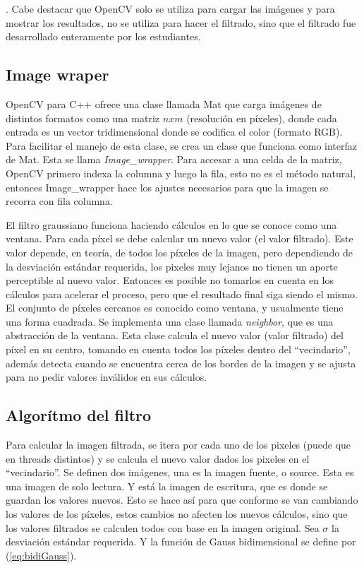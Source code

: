 \documentclass {article}
\begin{document}
. Cabe destacar que OpenCV
solo se utiliza para cargar las imágenes y para mostrar los resultados, no se utiliza para hacer el
filtrado, sino que el filtrado fue desarrollado enteramente por los estudiantes.

\subsection{Image wraper}
OpenCV para C++ ofrece una clase llamada Mat que carga imágenes de distintos formatos como una
matriz $nxm$ (resolución en píxeles), donde cada entrada es un vector tridimensional donde se
codifica el color (formato RGB). Para facilitar el manejo de esta clase, se crea un clase que
funciona como interfaz de Mat. Esta se llama \textit{Image\_wrapper}. Para accesar a una celda de la
matriz, OpenCV primero indexa la columna y luego la fila, esto no es el método natural, entonces
Image\_wrapper hace los ajustes necesarios para que la imagen se recorra con fila columna.

El filtro graussiano funciona haciendo cálculos en lo que se conoce como una ventana. Para cada
píxel se debe calcular un nuevo valor (el valor filtrado). Este valor depende, en teoría, de todos
los píxeles de la imagen, pero dependiendo de la desviación estándar requerida, los pixeles muy
lejanos no tienen un aporte perceptible al nuevo valor. Entonces es posible no tomarlos en cuenta en
los cálculos para acelerar el proceso, pero que el resultado final siga siendo el mismo. El conjunto
de píxeles cercanos es conocido como ventana, y usualmente tiene una forma cuadrada. Se implementa
una clase llamada \textit{neighbor}, que es una abstracción de la ventana. Esta clase calcula el
nuevo valor (valor filtrado) del píxel en su centro, tomando en cuenta todos los píxeles dentro del
``vecindario'', además detecta cuando
se encuentra cerca de los bordes de la imagen y se ajusta para no pedir valores inválidos en sus
cálculos.

\subsection{Algorítmo del filtro}

Para calcular la imagen filtrada, se itera por cada uno de los pixeles (puede que en threads
distintos) y se calcula el nuevo valor dados los pixeles en el ``vecindario''. Se definen dos
imágenes, una es la imagen fuente, o source. Esta es una imagen de solo lectura. Y está la imagen de
escritura, que es donde se guardan los valores nuevos. Esto se hace así para que conforme se van
cambiando los valores de los píxeles, estos cambios no afecten los nuevos cálculos, sino que los
valores filtrados se calculen todos con base en la imagen original. Sea $\sigma$ la desviación
estándar requerida. Y la función de Gauss bidimensional se define por (\ref{eq:bidiGauss}).
\end{document}
